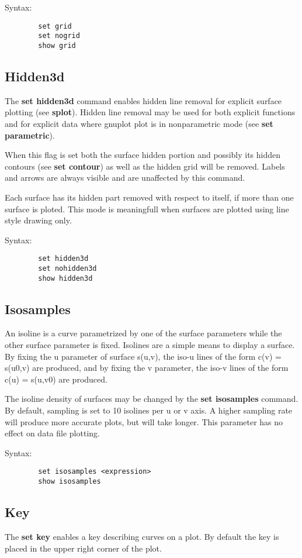 Syntax:
\begin{verbatim}
        set grid
        set nogrid
        show grid
\end{verbatim}
\subsection{Hidden3d}
The {\bf set hidden3d} command enables hidden line removal for explicit
surface plotting (see {\bf splot}).
Hidden line removal may be used for both explicit functions
and for explicit data where gnuplot plot is in nonparametric mode (see
{\bf set parametric}).

When this flag is set both the surface hidden portion and possibly
its hidden contours (see {\bf set contour}) as well as the hidden grid will be
removed. Labels and arrows are always visible and are unaffected by this
command.

Each surface has its hidden part removed with respect to itself, if more
than one surface is ploted. This mode is meaningfull when surfaces are
plotted using line style drawing only.

Syntax:
\begin{verbatim}
        set hidden3d
        set nohidden3d
        show hidden3d
\end{verbatim}
\subsection{Isosamples}
An isoline is a curve parametrized by one of the surface parameters
while the other surface parameter is fixed. Isolines are a simple
means to display a surface. By fixing the u parameter of surface
s(u,v), the iso-u lines of the form c(v) = s(u0,v) are produced, and
by fixing the v parameter, the iso-v lines of the form c(u) = s(u,v0)
are produced.

The isoline density of surfaces may be changed by the {\bf set isosamples}
command. By default, sampling is set to 10 isolines per u or v axis.
A higher sampling rate will produce more accurate plots, but will take
longer. This parameter has no effect on data file plotting.

Syntax:
\begin{verbatim}
        set isosamples <expression>
        show isosamples
\end{verbatim}
\subsection{Key}
The {\bf set key} enables a key describing curves on a plot.  By default
the key is placed in the upper right corner of the plot.

